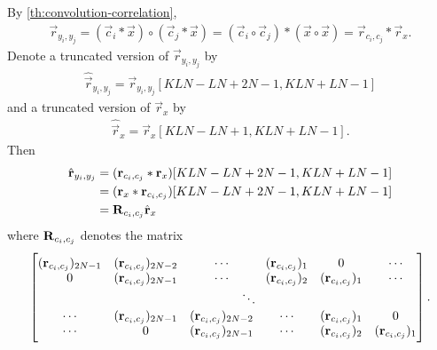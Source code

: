 \documentclass[a4paper, openany, oneside]{memoir}
\begin{document}
\begin{blockTheorem} \label{th:convolution-correlation}
     \nolinebreak
\end{blockTheorem}

By \cref{th:convolution-correlation},
\begin{align*}
    \vec{r}_{y_i,y_j} =(\vec{c}_i \ast \vec{x}) \circ (\vec{c}_j \ast \vec{x}) = (\vec{c}_i \circ \vec{c}_j) \ast (\vec{x} \circ \vec{x}) = \vec{r}_{c_i,c_j} \ast \vec{r}_x.
\end{align*}
Denote a truncated version of $\vec{r}_{y_i,y_j}$ by
\begin{align*}
    \hat{\vec{r}}_{y_i,y_j} = \vec{r}_{y_i,y_j}[KLN-LN+2N-1,KLN+LN-1]
\end{align*}
and a truncated version of $\vec{r}_x$ by
\begin{align*}
    \hat{\vec{r}}_x = \vec{r}_x [KLN-LN+1,KLN+LN-1].
\end{align*}
Then
\begin{align*}
    \hat{\boldsymbol{\mathbf{r}}}_{y_i,y_j}
    &= (\boldsymbol{\mathbf{r}}_{c_i,c_j} \ast \boldsymbol{\mathbf{r}}_x)[KLN-LN+2N-1,KLN+LN-1]\\
    &= (\boldsymbol{\mathbf{r}}_x \ast \boldsymbol{\mathbf{r}}_{c_i,c_j})[KLN-LN+2N-1,KLN+LN-1] \\
    &= \boldsymbol{\mathbf{R}}_{c_i,c_j} \hat{\boldsymbol{\mathbf{r}}}_x
\end{align*}
where $\boldsymbol{\mathbf{R}}_{c_i,c_j}$ denotes the matrix
\begin{align*}
    \begin{bmatrix}
        (\vec{r}_{c_i,c_j})_{2N-1} & (\vec{r}_{c_i,c_j})_{2N-2} & \cdots &(\vec{r}_{c_i,c_j})_{1} & 0 & \cdots  \\
        0 & (\vec{r}_{c_i,c_j})_{2N-1} & \cdots & (\vec{r}_{c_i,c_j})_{2} & (\vec{r}_{c_i,c_j})_{1} & \cdots \\
        && \multicolumn{2}{c}{\ddots} \\
        \cdots & (\vec{r}_{c_i,c_j})_{2N-1} & (\vec{r}_{c_i,c_j})_{2N-2} & \cdots & (\vec{r}_{c_i,c_j})_{1} & 0 \\
        \cdots & 0 & (\vec{r}_{c_i,c_j})_{2N-1} & \cdots &(\vec{r}_{c_i,c_j})_{2} & (\vec{r}_{c_i,c_j})_{1} 
    \end{bmatrix}.
\end{align*}
\end{document}
